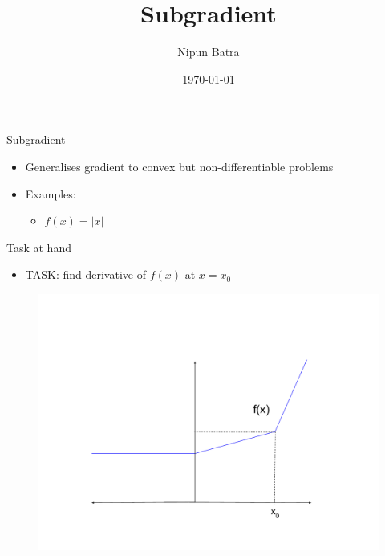 \documentclass{beamer}
\title{Subgradient}
\date{\today}
\author{Nipun Batra}
\institute{IIT Gandhinagar}
\begin{document}
  \maketitle


\begin{frame}{Subgradient }
\begin{itemize}
\item Generalises gradient to convex but non-differentiable problems
	\item Examples:
	\begin{itemize}
		\pause
\item $f(x) = |x|$
	\end{itemize}
	
\end{itemize}
\end{frame}

\begin{frame}{Task at hand}
\begin{itemize}
\item TASK: find derivative of $f(x)$ at $x = x_0$
\end{itemize}
\begin{figure}
    \centering
    \includegraphics[scale = 0.25]{subgradient_1.pdf}
    
    \label{fig:Non-differentiable function}
\end{figure}

\end{frame}
\end{document}

